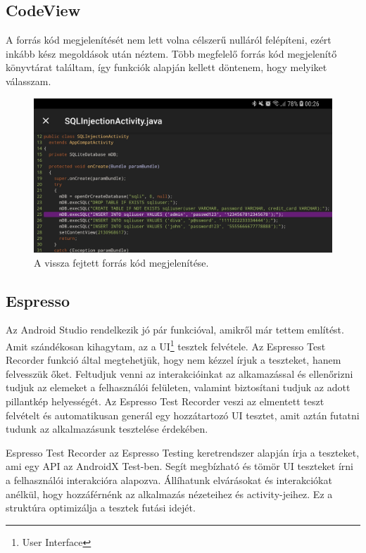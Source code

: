 \documentclass{thesis-ekf}
\theoremstyle{definition}
\theoremstyle{remark}
\begin{document}
\subsection{CodeView}

A forrás kód megjelenítését nem lett volna célszerű nulláról felépíteni, ezért inkább kész megoldások után néztem.
Több megfelelő forrás kód megjelenítő könyvtárat találtam, így funkciók alapján kellett döntenem, hogy melyiket válasszam.

\begin{figure}[!h]
	\centering
	\includegraphics[width=15cm]{pictures/code_view}
	\caption{A vissza fejtett forrás kód megjelenítése.}
	\label{dockerhub}
\end{figure}

\subsection{Espresso}

Az Android Studio rendelkezik jó pár funkcióval, amikről már tettem említést.
Amit szándékosan kihagytam, az a UI\footnote{User Interface} tesztek felvétele.
Az Espresso Test Recorder funkció által megtehetjük, hogy nem kézzel írjuk a teszteket, hanem felvesszük őket.
Feltudjuk venni az interakcióinkat az alkamazással és ellenőrizni tudjuk az elemeket a felhasználói felületen, valamint biztosítani tudjuk az adott pillantkép helyességét.
Az Espresso Test Recorder veszi az elmentett teszt felvételt és automatikusan generál egy hozzátartozó UI tesztet, amit aztán futatni tudunk az alkalmazásunk tesztelése érdekében.

Espresso Test Recorder az Espresso Testing keretrendszer alapján írja a teszteket, ami egy API az AndroidX Test-ben.
Segít megbízható és tömör UI teszteket írni a felhasználói interakcióra alapozva.
Állíhatunk elvárásokat és interakciókat anélkül, hogy hozzáférnénk az alkalmazás nézeteihez és activity-jeihez.
Ez a struktúra optimizálja a tesztek futási idejét. \cite{espresso}
\end{document}
